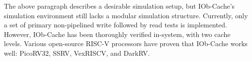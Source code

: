 The above paragraph describes a desirable simulation setup, but IOb-Cache's
simulation environment still lacks a modular simulation structure. Currently,
only a set of primary non-pipelined write followed by read tests is
implemented. However, IOb-Cache has been thoroughly verified in-system, with two
cache levels. Various open-source RISC-V processors have proven that IOb-Cache
works well: PicoRV32, SSRV, VexRISCV, and DarkRV.
\clearpage
